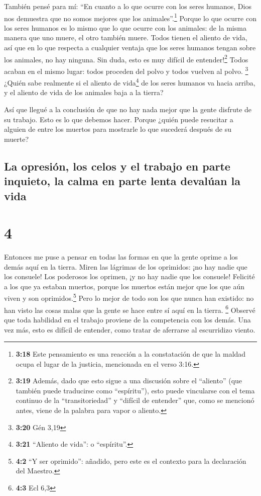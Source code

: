  También pensé para mí: ``En cuanto a lo que ocurre con
los seres humanos, Dios nos demuestra que no somos mejores que los
animales''.\footnote{\textbf{3:18} Este pensamiento es una reacción a la
  constatación de que la maldad ocupa el lugar de la justicia,
  mencionada en el verso 3:16.}  Porque lo que ocurre con
los seres humanos es lo mismo que lo que ocurre con los animales: de la
misma manera que uno muere, el otro también muere. Todos tienen el
aliento de vida, así que en lo que respecta a cualquier ventaja que los
seres humanos tengan sobre los animales, no hay ninguna. Sin duda, esto
es muy difícil de entender!\footnote{\textbf{3:19} Además, dado que esto
  sigue a una discusión sobre el ``aliento'' (que también puede
  traducirse como ``espíritu''), esto puede vincularse con el tema
  continuo de la ``transitoriedad'' y ``difícil de entender'' que, como
  se mencionó antes, viene de la palabra para vapor o aliento.}
 Todos acaban en el mismo lugar: todos proceden del polvo
y todos vuelven al polvo. \footnote{\textbf{3:20} Gén 3,19}
 ¿Quién sabe realmente si el aliento de vida\footnote{\textbf{3:21}
  ``Aliento de vida'': o ``espíritu''.} de los seres humanos va hacia
arriba, y el aliento de vida de los animales baja a la tierra?

 Así que llegué a la conclusión de que no hay nada mejor
que la gente disfrute de su trabajo. Esto es lo que debemos hacer.
Porque ¿quién puede resucitar a alguien de entre los muertos para
mostrarle lo que sucederá después de su muerte?

\hypertarget{la-opresiuxf3n-los-celos-y-el-trabajo-en-parte-inquieto-la-calma-en-parte-lenta-devaluxfaan-la-vida}{%
\subsection{La opresión, los celos y el trabajo en parte inquieto, la
calma en parte lenta devalúan la
vida}\label{la-opresiuxf3n-los-celos-y-el-trabajo-en-parte-inquieto-la-calma-en-parte-lenta-devaluxfaan-la-vida}}

\hypertarget{section-3}{%
\section{4}\label{section-3}}

 Entonces me puse a pensar en todas las formas en que la
gente oprime a los demás aquí en la tierra. Miren las lágrimas de los
oprimidos: ¡no hay nadie que los consuele! Los poderosos los oprimen, ¡y
no hay nadie que los consuele!  Felicité a los que ya
estaban muertos, porque los muertos están mejor que los que aún viven y
son oprimidos.\footnote{\textbf{4:2} ``Y ser oprimido'': añadido, pero
  este es el contexto para la declaración del Maestro.} 
Pero lo mejor de todo son los que nunca han existido: no han visto las
cosas malas que la gente se hace entre sí aquí en la tierra. \footnote{\textbf{4:3}
  Ecl 6,3}  Observé que toda habilidad en el trabajo
proviene de la competencia con los demás. Una vez más, esto es difícil
de entender, como tratar de aferrarse al escurridizo viento.

